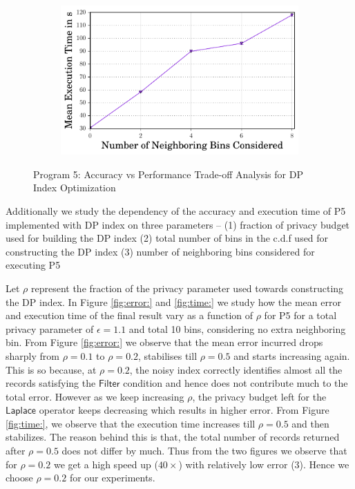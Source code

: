 \begin{figure}[ht]
\begin{subfigure}[b]{0.45\linewidth}
        \caption{}
        \label{fig:error:NeighboringBins}\end{subfigure}
        \begin{subfigure}[b]{0.45\linewidth}
        \includegraphics[width=1\linewidth]{index_NeigboringBins_time.pdf}
        \caption{}
        \label{fig:time:NeighboringBins}
        \end{subfigure}
        \caption{Program 5: Accuracy vs Performance Trade-off Analysis for DP Index Optimization }\label{index}  \vspace{-0.2cm} 
    \end{figure}
 
  
Additionally we study the dependency of the accuracy and execution time of P5 implemented with DP index on three parameters -- (1) fraction of privacy budget used for building the DP index (2) total number of bins in the c.d.f used for constructing the DP index (3) number of neighboring bins considered for executing P5

Let $\rho$ represent the fraction of the privacy parameter used towards constructing the DP index. In Figure \ref{fig:error:} and \ref{fig:time:} we study how the mean error and execution time of the final result vary as a function of $\rho$ for P5 for a total privacy parameter of $\epsilon=1.1$ and total 10 bins, considering no extra neighboring bin.  From Figure \ref{fig:error:} we observe that the mean error incurred drops sharply from $\rho=0.1$ to $\rho=0.2$, stabilises till $\rho=0.5$ and starts increasing again. This is so because, at $\rho=0.2$, the noisy index correctly identifies almost all the records satisfying the $\textsf{Filter}$ condition and hence does not contribute much to the total error. However as we keep increasing $\rho$, the privacy budget left for the $\textsf{Laplace}$ operator keeps decreasing which results in higher error. From Figure \ref{fig:time:}, we observe that the execution time increases till $\rho=0.5$ and then stabilizes. The reason behind this is that, the total number of records returned after $\rho=0.5$ does not differ by much. Thus from the two figures we observe that for $\rho=0.2$ we get a high speed up ($40\times$) with relatively low error ($3$). Hence we choose $\rho=0.2$ for our experiments. %

